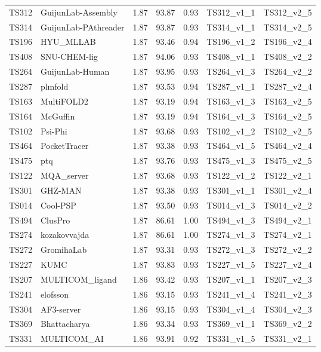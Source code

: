 \begin{longtable}{lllllll}
TS312 & GuijunLab-Assembly & 1.87 & 93.87 & 0.93 & TS312\_v1\_1 & TS312\_v2\_5 \\ 
TS314 & GuijunLab-PAthreader & 1.87 & 93.87 & 0.93 & TS314\_v1\_1 & TS314\_v2\_5 \\ 
TS196 & HYU\_MLLAB & 1.87 & 93.46 & 0.94 & TS196\_v1\_2 & TS196\_v2\_4 \\ 
TS408 & SNU-CHEM-lig & 1.87 & 94.06 & 0.93 & TS408\_v1\_1 & TS408\_v2\_2 \\ 
TS264 & GuijunLab-Human & 1.87 & 93.95 & 0.93 & TS264\_v1\_3 & TS264\_v2\_2 \\ 
TS287 & plmfold & 1.87 & 93.53 & 0.94 & TS287\_v1\_1 & TS287\_v2\_4 \\ 
TS163 & MultiFOLD2 & 1.87 & 93.19 & 0.94 & TS163\_v1\_3 & TS163\_v2\_5 \\ 
TS164 & McGuffin & 1.87 & 93.19 & 0.94 & TS164\_v1\_3 & TS164\_v2\_5 \\ 
TS102 & Psi-Phi & 1.87 & 93.68 & 0.93 & TS102\_v1\_2 & TS102\_v2\_5 \\ 
TS464 & PocketTracer & 1.87 & 93.38 & 0.93 & TS464\_v1\_5 & TS464\_v2\_4 \\ 
TS475 & ptq & 1.87 & 93.76 & 0.93 & TS475\_v1\_3 & TS475\_v2\_5 \\ 
TS122 & MQA\_server & 1.87 & 93.68 & 0.93 & TS122\_v1\_2 & TS122\_v2\_1 \\ 
TS301 & GHZ-MAN & 1.87 & 93.38 & 0.93 & TS301\_v1\_1 & TS301\_v2\_4 \\ 
TS014 & Cool-PSP & 1.87 & 93.50 & 0.93 & TS014\_v1\_3 & TS014\_v2\_2 \\ 
TS494 & ClusPro & 1.87 & 86.61 & 1.00 & TS494\_v1\_3 & TS494\_v2\_1 \\ 
TS274 & kozakovvajda & 1.87 & 86.61 & 1.00 & TS274\_v1\_3 & TS274\_v2\_1 \\ 
TS272 & GromihaLab & 1.87 & 93.31 & 0.93 & TS272\_v1\_3 & TS272\_v2\_2 \\ 
TS227 & KUMC & 1.87 & 93.83 & 0.93 & TS227\_v1\_5 & TS227\_v2\_4 \\ 
TS207 & MULTICOM\_ligand & 1.86 & 93.42 & 0.93 & TS207\_v1\_1 & TS207\_v2\_3 \\ 
TS241 & elofsson & 1.86 & 93.15 & 0.93 & TS241\_v1\_4 & TS241\_v2\_3 \\ 
TS304 & AF3-server & 1.86 & 93.15 & 0.93 & TS304\_v1\_4 & TS304\_v2\_3 \\ 
TS369 & Bhattacharya & 1.86 & 93.34 & 0.93 & TS369\_v1\_1 & TS369\_v2\_2 \\ 
TS331 & MULTICOM\_AI & 1.86 & 93.91 & 0.92 & TS331\_v1\_5 & TS331\_v2\_1 \\ 

\end{longtable}
